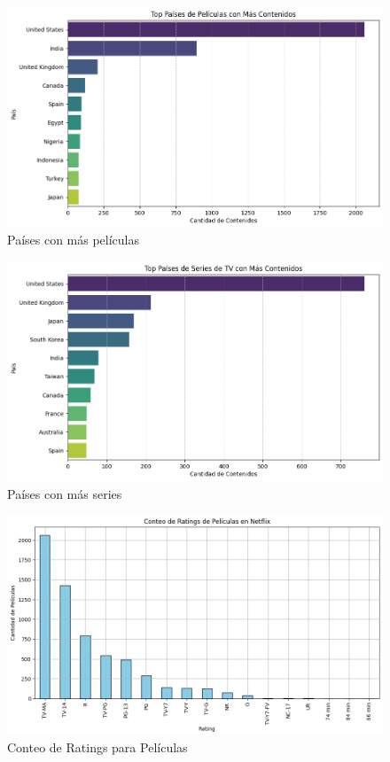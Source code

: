 \documentclass{article}
\begin{document}
\begin{figure}[H]
    \centering
    \includegraphics[width=\textwidth]{Graphs/paises_peliculas.png}
    \caption{Países con más películas}
    \label{fig:peliculas_paises}
\end{figure}

\begin{figure}[H]
    \centering
    \includegraphics[width=\textwidth]{Graphs/paises_series.png}
    \caption{Países con más series}
    \label{fig:peliculas_paises}
\end{figure}

\begin{figure}[H]
    \centering
    \includegraphics[width=\textwidth]{Graphs/conteo_rating_peliculas.png}
    \caption{Conteo de Ratings para Películas}
    \label{fig:conteo_ratings_peliculas}
\end{figure}
\end{document}
